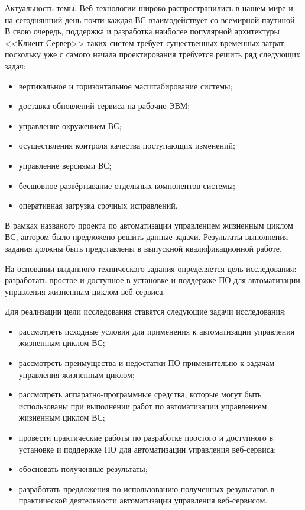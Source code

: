 \Introduction

Актуальность темы.
Веб технологии широко распространились в нашем мире и на сегодняшний день почти каждая ВС взаимодействует со всемирной паутиной.
В свою очередь, поддержка и разработка наиболее популярной архитектуры <<Клиент-Сервер>> таких систем требует существенных временных затрат, поскольку уже с самого начала проектирования требуется решить ряд следующих задач:

\begin{itemize}
    \item вертикальное и горизонтальное масштабирование системы;
    \item доставка обновлений сервиса на рабочие ЭВМ;
    \item управление окружением ВС;
    \item осуществления контроля качества поступающих изменений;
    \item управление версиями ВС;
    \item бесшовное развёртывание отдельных компонентов системы;
    \item оперативная загрузка срочных исправлений.
\end{itemize}

В рамках названого проекта по автоматизации управлением жизненным циклом ВС, автором было предложено решить данные задачи.
Результаты выполнения задания должны быть представлены в выпускной квалификационной работе.

На основании выданного технического задания определяется цель исследования: разработать простое и доступное в установке и поддержке ПО для автоматизации управления жизненным циклом веб-сервиса.

Для реализации цели исследования ставятся следующие задачи исследования:

\begin{itemize}
    \item рассмотреть исходные условия для применения к автоматизации управления жизненным циклом ВС;
    \item рассмотреть преимущества и недостатки ПО применительно к задачам управления жизненным циклом;
    \item рассмотреть аппаратно-программные средства, которые могут быть использованы при выполнении работ по автоматизации управлением жизненным циклом ВС;
    \item провести практические работы по разработке простого и доступного в установке и поддержке ПО для автоматизации управления веб-сервиса;
    \item обосновать полученные результаты;
    \item разработать предложения по использованию полученных результатов в практической деятельности автоматизации управления веб-сервисом.
\end{itemize}

